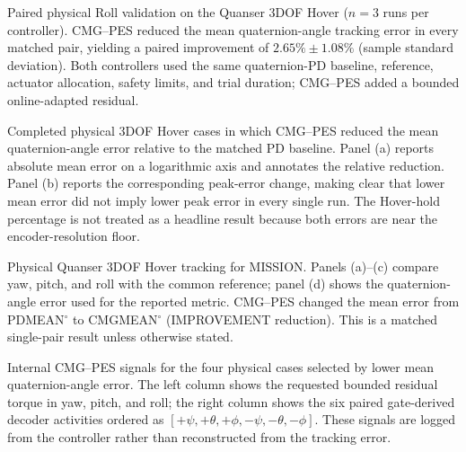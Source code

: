 
\caption{Paired physical Roll validation on the Quanser 3DOF Hover
($n=3$ runs per controller).  CMG--PES reduced the mean quaternion-angle
tracking error in every matched pair, yielding a paired improvement of
$2.65\%\pm1.08\%$ (sample standard deviation).  Both controllers used the
same quaternion-PD baseline, reference, actuator allocation, safety limits,
and trial duration; CMG--PES added a bounded online-adapted residual.}

\caption{Completed physical 3DOF Hover cases in which CMG--PES reduced the
mean quaternion-angle error relative to the matched PD baseline.  Panel (a)
reports absolute mean error on a logarithmic axis and annotates the relative
reduction.  Panel (b) reports the corresponding peak-error change, making
clear that lower mean error did not imply lower peak error in every single
run.  The Hover-hold percentage is not treated as a headline result because
both errors are near the encoder-resolution floor.}

\caption{Physical Quanser 3DOF Hover tracking for MISSION.  Panels (a)--(c)
compare yaw, pitch, and roll with the common reference; panel (d) shows the
quaternion-angle error used for the reported metric.  CMG--PES changed the
mean error from PDMEAN$^\circ$ to CMGMEAN$^\circ$ (IMPROVEMENT reduction).
This is a matched single-pair result unless otherwise stated.}

\caption{Internal CMG--PES signals for the four physical cases selected by
lower mean quaternion-angle error.  The left column shows the requested
bounded residual torque in yaw, pitch, and roll; the right column shows the
six paired gate-derived decoder activities ordered as
$[+\psi,+\theta,+\phi,-\psi,-\theta,-\phi]$.  These signals are logged from
the controller rather than reconstructed from the tracking error.}

